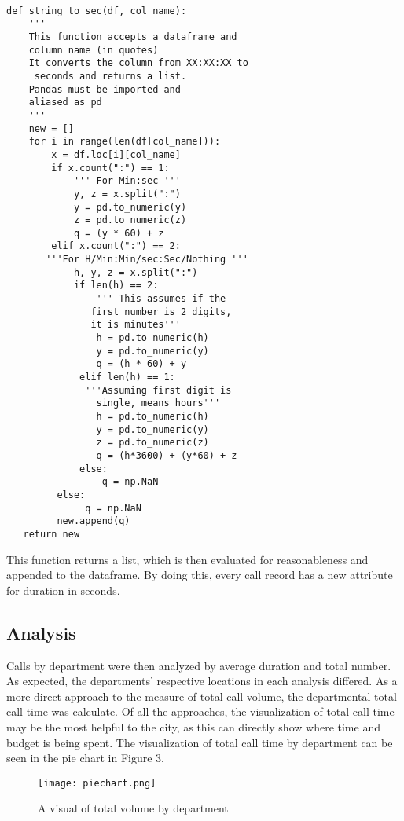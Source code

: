 \documentclass[11pt,twocolumn]{article}
\begin{document}
  \begin{Verbatim}[fontsize=\small]
  
def string_to_sec(df, col_name):
    ''' 
    This function accepts a dataframe and 
    column name (in quotes)
    It converts the column from XX:XX:XX to
     seconds and returns a list.
    Pandas must be imported and 
    aliased as pd
    '''
    new = []
    for i in range(len(df[col_name])):
        x = df.loc[i][col_name]
        if x.count(":") == 1:
            ''' For Min:sec '''
            y, z = x.split(":")
            y = pd.to_numeric(y)
            z = pd.to_numeric(z)
            q = (y * 60) + z
        elif x.count(":") == 2:
       '''For H/Min:Min/sec:Sec/Nothing '''
            h, y, z = x.split(":")
            if len(h) == 2:
                ''' This assumes if the
               first number is 2 digits,
               it is minutes'''
                h = pd.to_numeric(h)
                y = pd.to_numeric(y)
                q = (h * 60) + y
             elif len(h) == 1:
              '''Assuming first digit is 
                single, means hours'''
                h = pd.to_numeric(h)
                y = pd.to_numeric(y)
                z = pd.to_numeric(z)
                q = (h*3600) + (y*60) + z
             else:
                 q = np.NaN
         else:
              q = np.NaN
         new.append(q)
   return new
  \end{Verbatim}

This function returns a list, which is then evaluated for reasonableness and appended to the dataframe.  By doing this, every call record has a new attribute for duration in seconds.

\subsection{Analysis}
Calls by department were then analyzed by average duration and total number.  As expected, the departments' respective locations in each analysis differed.  As a more direct approach to the measure of total call volume, the departmental total call time was calculate.  Of all the approaches, the visualization of total call time may be the most helpful to the city, as this can directly show where time and budget is being spent.  The visualization of total call time by department can be seen in the pie chart in Figure 3.
\begin{figure}[h]
  \texttt{[image: piechart.png]}
  \caption{A visual of total volume by department}
 \end{figure}
 
\end{document}
